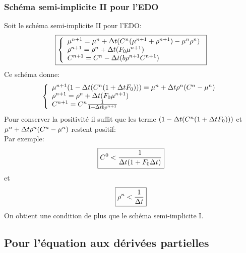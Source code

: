 \subsubsection{Schéma semi-implicite II pour l'EDO}
Soit le schéma semi-implicite II pour l'EDO:
\begin{equation} \boxed{\left\{
                \begin{array}{ll}
                   \mu^{n+1} = \mu^{n}+  \Delta t( C^{n}(\mu^{n+1} + \rho^{n+1}) -\mu^{n}\rho^{n})\\
                \rho^{n+1}=  \rho^{n}+ \Delta t (F_0 \mu^{n+1}) \\
                 C^{n+1} =C^{n}- \Delta t(b\rho^{n+1}C^{n+1})
                \end{array}
              \right.}
\end{equation}
Ce schéma donne:
\begin{equation*} \left\{
                \begin{array}{ll}
                   \mu^{n+1}(1-\Delta t(C^{n}(1+\Delta t F_0))) = \mu^{n}+  \Delta t \rho^{n}(C^{n}-\mu^{n}) \\
                \rho^{n+1}=  \rho^{n}+ \Delta t (F_0 \mu^{n+1}) \\
                 C^{n+1} =C^{n}\frac{1}{1+ \Delta t b\rho^{n+1}}
                \end{array}
              \right.
\end{equation*}
Pour conserver la positivité il suffit que les terme $(1-\Delta t(C^{n}(1+\Delta t F_0)))$ et $\mu^{n}+  \Delta t \rho^{n}(C^{n}-\mu^{n})$ restent positif:\\
Par exemple: 
\begin{equation}
	\boxed{C^0< \frac{1}{\Delta t(1+F_0\Delta t)}}
\end{equation}
et 
\begin{equation}
	\boxed{\rho^n< \frac{1}{\Delta t}}
\end{equation}
On obtient une condition de plus que le schéma semi-implicite I.
\subsection{Pour l'équation aux dérivées partielles}
